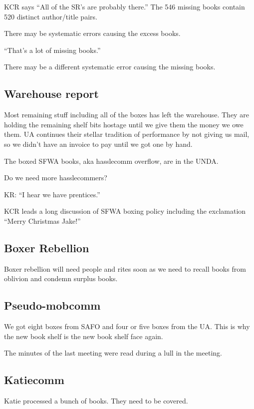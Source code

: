 \documentclass[10pt]{article}
\begin{document}
KCR says ``All of the SR's are probably there.''
The 546 missing books contain 520 distinct author/title pairs.

There may be systematic errors causing the excess books.

``That's a lot of missing books.''

There may be a different systematic error causing the missing books.

\subsection*{Warehouse report}

Most remaining stuff including all of the boxes has left the warehouse.
They are holding the remaining shelf bits hostage until we give them the
money we owe them.  UA continues their stellar tradition of performance
by not giving us mail, so we didn't have an invoice to pay until we got
one by hand.

The boxed SFWA books, aka hasslecomm overflow, are in the UNDA.

Do we need more hasslecommers?

KR: ``I hear we have prentices.''

KCR leads a long discussion of SFWA boxing policy including the
exclamation ``Merry Christmas Jake!''

\subsection*{Boxer Rebellion}

Boxer rebellion will need people and rites soon as we need to
recall books from oblivion and condemn surplus books.


\subsection*{Pseudo-mobcomm}

We got eight boxes from SAFO and four or five boxes from the UA.
This is why the new book shelf is the new book shelf face again.

The minutes of the last meeting were read during a lull in the meeting.

\subsection*{Katiecomm}

Katie processed a bunch of books.  They need to be covered.
\end{document}
